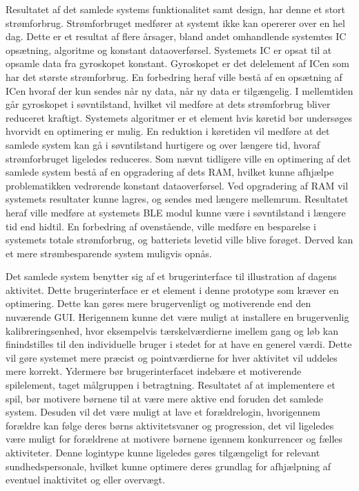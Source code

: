 Resultatet af det samlede systems funktionalitet samt design, har denne et stort strømforbrug. Strømforbruget medfører at systemt ikke kan opererer over en hel dag. Dette er et resultat af flere årsager, bland andet omhandlende systemtes IC opsætning, algoritme og konstant dataoverførsel. Systemets IC er opsat til at opsamle data fra gyroskopet konstant. Gyroskopet er det delelement af ICen som har det største strømforbrug. En forbedring heraf ville bestå af en opsætning af ICen hvoraf der kun sendes når ny data, når ny data er tilgængelig. I mellemtiden går gyroskopet i søvntilstand, hvilket vil medføre at dets strømforbrug bliver reduceret kraftigt. Systemets algoritmer er et element hvis køretid bør undersøges hvorvidt en optimering er mulig. En reduktion i køretiden vil medføre at det samlede system kan gå i søvntilstand hurtigere og over længere tid, hvoraf strømforbruget ligeledes reduceres. Som nævnt tidligere ville en optimering af det samlede system bestå af en opgradering af dets RAM, hvilket kunne afhjælpe problematikken vedrørende konstant dataoverførsel. Ved opgradering af RAM vil systemets resultater kunne lagres, og sendes med længere mellemrum. Resultatet heraf ville medføre at systemets BLE modul kunne være i søvntilstand i længere tid end hidtil. En forbedring af ovenstående,  ville medføre en besparelse i systemets totale strømforbrug, og batteriets levetid ville blive forøget. Derved kan et mere strømbesparende system muligvis opnås.

Det samlede system benytter sig af et brugerinterface til illustration af dagens aktivitet. Dette brugerinterface er et element i denne prototype som kræver en optimering. Dette kan gøres mere brugervenligt og motiverende end den nuværende GUI. Herigennem kunne det være muligt at installere en brugervenlig kalibreringsenhed, hvor eksempelvis tærskelværdierne imellem gang og løb kan finindstilles til den individuelle bruger i stedet for at have en generel værdi. Dette vil gøre systemet mere præcist og pointværdierne for hver aktivitet vil uddeles mere korrekt. Ydermere bør brugerinterfacet indebære et motiverende spilelement, taget målgruppen i betragtning. Resultatet af at implementere et spil, bør motivere børnene til at være mere aktive end foruden det samlede system. Desuden vil det være muligt at lave et forældrelogin, hvorigennem forældre kan følge deres børns aktivitetsvaner og progression, det vil ligeledes være muligt for forældrene at motivere børnene igennem konkurrencer og fælles aktiviteter. Denne logintype kunne ligeledes gøres tilgængeligt for relevant sundhedspersonale, hvilket kunne optimere deres grundlag for afhjælpning af eventuel inaktivitet og eller overvægt.

